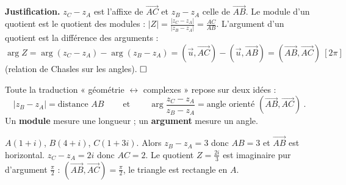 \noindent\textbf{Justification.} $z_C-z_A$ est l'affixe de $\overrightarrow{AC}$ et $z_B-z_A$
celle de $\overrightarrow{AB}$. Le module d'un quotient est le quotient des modules :
$|Z|=\frac{|z_C-z_A|}{|z_B-z_A|}=\frac{AC}{AB}$. L'argument d'un quotient est la différence des
arguments : $\arg Z=\arg(z_C-z_A)-\arg(z_B-z_A)=(\vec u,\overrightarrow{AC})-(\vec u,\overrightarrow{AB})
=(\overrightarrow{AB},\overrightarrow{AC})\ [2\pi]$ (relation de Chasles sur les angles). $\hfill\square$

\begin{aretenir}
Toute la traduction « géométrie $\leftrightarrow$ complexes » repose sur deux idées :
\[
\boxed{\ |z_B-z_A|=\text{distance } AB\ }\qquad\text{et}\qquad
\boxed{\ \arg\dfrac{z_C-z_A}{z_B-z_A}=\text{angle orienté }(\overrightarrow{AB},\overrightarrow{AC})\ }.
\]
Un \textbf{module} mesure une longueur ; un \textbf{argument} mesure un angle.
\end{aretenir}

\begin{illus}
\end{illus}

\begin{exemple}
$A(1+i)$, $B(4+i)$, $C(1+3i)$. Alors $z_B-z_A=3$ donc $AB=3$ et
$\overrightarrow{AB}$ est horizontal. $z_C-z_A=2i$ donc $AC=2$. Le quotient
$Z=\frac{2i}{3}$ est imaginaire pur d'argument $\frac\pi2$ : $(\overrightarrow{AB},\overrightarrow{AC})=\frac\pi2$,
le triangle est rectangle en $A$.
\end{exemple}

